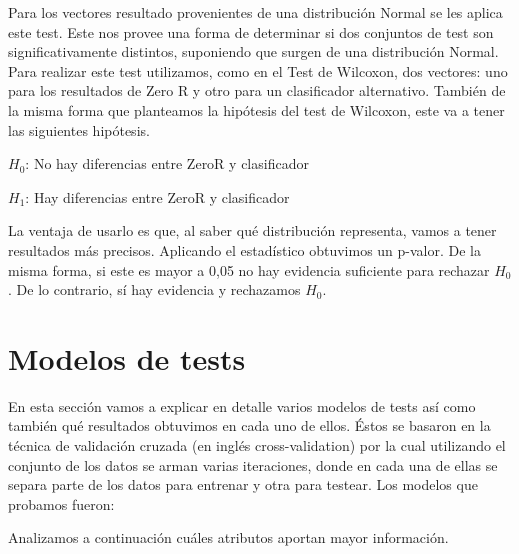 
Para los vectores resultado provenientes de una distribución Normal se les aplica este test. Este nos provee una forma de determinar si dos conjuntos de test son significativamente distintos, suponiendo que surgen de una distribución Normal. Para realizar este test utilizamos, como en el Test de Wilcoxon, dos vectores: uno para los resultados de Zero R y otro para un clasificador alternativo. 
También de la misma forma que planteamos la hipótesis del test de Wilcoxon, este va a tener las siguientes hipótesis. 

\vspace{0.5cm}
\hspace{2cm}$H_0$: No hay diferencias entre ZeroR y clasificador
\vspace{0.25cm}

\hspace{2cm}$H_1$: Hay diferencias entre ZeroR y clasificador
\vspace{0.5cm}

La ventaja de usarlo es que, al saber qué distribución representa, vamos a tener resultados más precisos. Aplicando el estadístico obtuvimos un p-valor. De la misma forma, si este es mayor a 0,05 no hay evidencia suficiente para rechazar $H_0$. De lo contrario, sí hay evidencia y rechazamos $H_0$.

\section{Modelos de tests}

En esta sección vamos a explicar en detalle varios modelos de tests así como también qué resultados obtuvimos en cada uno de ellos. Éstos se basaron en la técnica de validación cruzada (en inglés cross-validation) por la cual utilizando el conjunto de los datos se arman varias iteraciones, donde en cada una de ellas se separa parte de los datos para entrenar y otra para testear. Los modelos que probamos fueron:







Analizamos a continuación cuáles atributos aportan mayor información.


